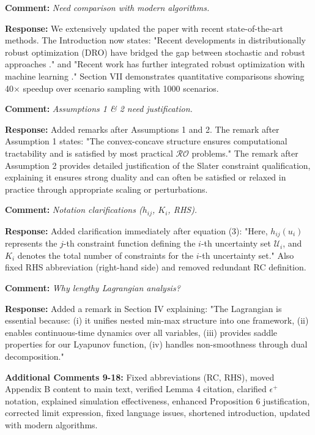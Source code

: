 \documentclass[journal,twoside,web]{ieeecolor}
\begin{document}
\textbf{Comment:} \textit{Need comparison with modern algorithms.}

\textbf{Response:} We extensively updated the paper with recent state-of-the-art methods. The Introduction now states: "Recent developments in distributionally robust optimization (DRO) have bridged the gap between stochastic and robust approaches \cite{aigner2023,yang2023}." and "Recent work has further integrated robust optimization with machine learning \cite{zhu2023zeroth,madry2018adversarial}." Section VII demonstrates quantitative comparisons showing 40× speedup over scenario sampling with 1000 scenarios.

\textbf{Comment:} \textit{Assumptions 1 \& 2 need justification.}

\textbf{Response:} Added remarks after Assumptions 1 and 2. The remark after Assumption 1 states: "The convex-concave structure ensures computational tractability and is satisfied by most practical $\mathcal{RO}$ problems." The remark after Assumption 2 provides detailed justification of the Slater constraint qualification, explaining it ensures strong duality and can often be satisfied or relaxed in practice through appropriate scaling or perturbations.

\textbf{Comment:} \textit{Notation clarifications ($h_{ij}$, $K_i$, RHS).}

\textbf{Response:} Added clarification immediately after equation (3): "Here, $h_{ij}(u_i)$ represents the $j$-th constraint function defining the $i$-th uncertainty set $\mathcal{U}_i$, and $K_i$ denotes the total number of constraints for the $i$-th uncertainty set." Also fixed RHS abbreviation (right-hand side) and removed redundant RC definition.

\textbf{Comment:} \textit{Why lengthy Lagrangian analysis?}

\textbf{Response:} Added a remark in Section IV explaining: "The Lagrangian is essential because: (i) it unifies nested min-max structure into one framework, (ii) enables continuous-time dynamics over all variables, (iii) provides saddle properties for our Lyapunov function, (iv) handles non-smoothness through dual decomposition."

\textbf{Additional Comments 9-18:} Fixed abbreviations (RC, RHS), moved Appendix B content to main text, verified Lemma 4 citation, clarified $\epsilon^+$ notation, explained simulation effectiveness, enhanced Proposition 6 justification, corrected limit expression, fixed language issues, shortened introduction, updated with modern algorithms.
\end{document}
